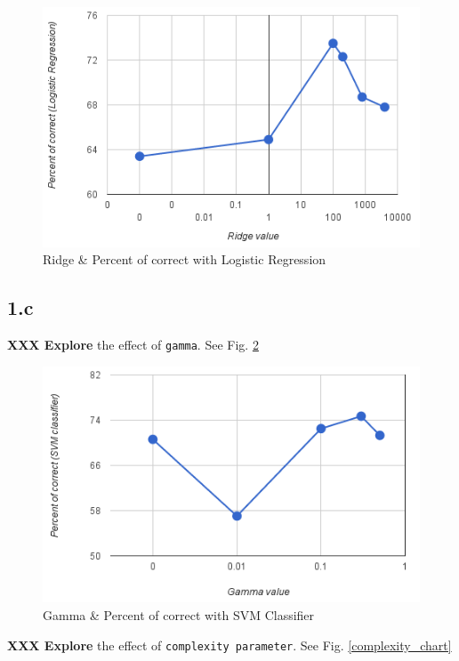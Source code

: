 \documentclass[12pt,journal,compsoc]{IEEEtran}
\begin{document}
\begin{figure}
\label{ridge_chart}
\caption{Ridge \& Percent of correct with Logistic Regression}
\includegraphics[scale=0.6]{ridge_accuracy}
\end{figure}

\subsection*{1.c}
\textbf{XXX Explore} the effect of \texttt{gamma}. See Fig. \ref{gamma_chart}

\begin{figure}
\label{gamma_chart}
\caption{Gamma \& Percent of correct with SVM Classifier}
\includegraphics[scale=0.6]{gamma_accuracy}
\end{figure}

\textbf{XXX Explore} the effect of \texttt{complexity parameter}. See Fig. \ref{complexity_chart}
\end{document}
